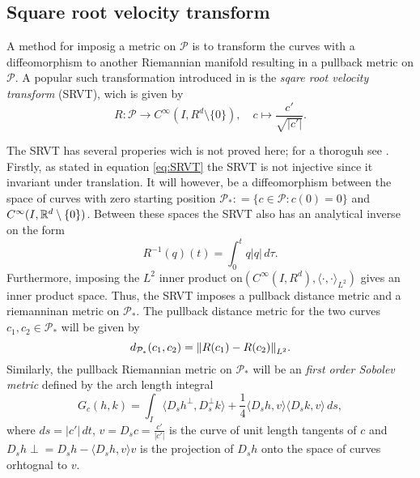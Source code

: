 \subsection{Square root velocity transform}
A method for imposig a metric on \(\mathcal{P}\) is to transform the curves with a diffeomorphism to another Riemannian manifold resulting in a pullback metric on \(\mathcal{P}\). A popular such transformation introduced in \cite{srivastava2011_srvt} is the \emph{sqare root velocity transform} (SRVT), wich is given by 
\begin{equation}\label{eq:SRVT}
  R :\mathcal{P} \rightarrow C^{\infty}(I, R^d \setminus \{0\}), \quad c \mapsto \frac{c'}{\sqrt{\vert c' \vert}}.
\end{equation} 

The SRVT has several properies wich is not proved here; for a thoroguh  see \cite{bruveris1016_srvtexample,bauer2014_rprop}. Firstly, as stated in equation \eqref{eq:SRVT} the SRVT is not injective since it invariant under translation. It will however, be a diffeomorphism between the space of curves with zero starting position \(\mathcal{P}_* : = \{c \in \mathcal{P}: c(0) = 0\} \) and \(C^{\infty}(I, \mathbb{R}^d \setminus \{0\})\). Between these spaces the SRVT also has an analytical inverse on the form 
\begin{equation}
  R^{-1}(q)(t) = \int_0 ^t q \vert q\vert \,d\tau.
\end{equation}
Furthermore, imposing the \(L^2\) inner product on\((C^{\infty}(I, R^d), \langle \cdot , \cdot \rangle_{L^2} )\) gives an inner product space. Thus, the SRVT imposes a pullback distance metric and a riemanninan metric on \(\mathcal{P}_*\). The pullback distance metric for the two curves \(c_1, c_2 \in \mathcal{P}_*\) will be given by
\begin{equation}\label{eq:sob_pullback_dist}
  d_{\mathcal{P}_*}(c_1, c_2) = \norm{R(c_1) - R(c_2)}_{L^2}.
\end{equation}
Similarly, the pullback Riemannian metric on \(\mathcal{P}_*\) will be an \emph{first order Sobolev metric} defined by the arch length integral
\begin{equation}
  G_c(h,k) = \int_I \langle D_s h^\perp ,D_s^\perp k \rangle+\frac{1}{4}\langle D_s h,v\rangle \langle D_s k,v\rangle \,ds,
\end{equation}
where \(ds = \vert c' \vert\,dt\), \(v = D_s c = \frac{c'}{\vert c'\vert}\) is the curve of unit length tangents of \(c\) and \(D_s h \perp = D_s h  - \langle D_s h,v\rangle v\) is the projection of \(D_s h\) onto the space of curves orhtognal to \(v\). 

